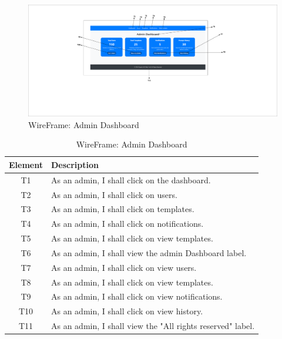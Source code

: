 \documentclass[12pt]{report}
\begin{document}
\begin{figure}[ht]
    \centering
    \includegraphics[width=1\textwidth, trim=10cm 10cm 10cm 2cm, clip]{Media/2.pdf} %
    \caption{WireFrame: Admin Dashboard}
    \label{fig:drawing1}
\end{figure}

\begin{table}[h!]
    \centering
    \begin{tabular}{|c|p{10cm}|}
        \hline
        \textbf{Element} & \textbf{Description} \\
        \hline
        T1 & As an admin, I shall click on the dashboard. \\
        \hline
        T2 & As an admin, I shall click on users. \\
        \hline
        T3 & As an admin, I shall click on templates. \\
        \hline
        T4 & As an admin, I shall click on notifications. \\
        \hline
        T5 & As an admin, I shall click on view templates. \\
        \hline
        T6 & As an admin, I shall view the admin Dashboard label. \\
        \hline
        T7 & As an admin, I shall click on view users. \\
        \hline
        T8 & As an admin, I shall click on view templates. \\
        \hline
        T9 & As an admin, I shall click on view notifications. \\
        \hline
        T10 & As an admin, I shall click on view history. \\
        \hline
        T11 & As an admin, I shall view the "All rights reserved" label. \\
        \hline
    \end{tabular}
    \caption{WireFrame: Admin Dashboard}
    \label{tab:admin_actions}
\end{table}
\end{document}
